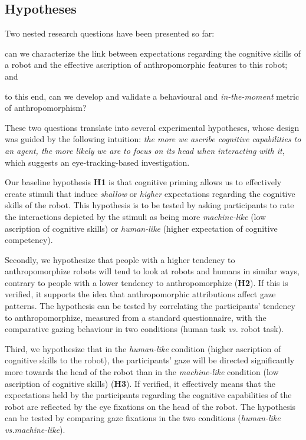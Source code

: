 \documentclass[lettersize, noapacite, twoside, HRI]{apa_HRI}
\newcommand{\vs}{\textit{vs.}\xspace}
\newcommand{\h}[1]{\textbf{H#1}\xspace}
\begin{document}
\subsection{Hypotheses}

\begin{inparaenum}
Two nested research questions have been presented so far: \item can we
characterize the link between expectations regarding the cognitive
skills of a robot and the effective ascription of anthropomorphic features to
this robot; and \item to this end, can we develop and validate a behavioural and
\emph{in-the-moment} metric of anthropomorphism?  \end{inparaenum}

These two questions translate into several experimental hypotheses, whose design
was guided by the following intuition: \emph{the more we ascribe cognitive
capabilities to an agent, the more likely we are to focus on its head when
interacting with it}, which suggests an eye-tracking-based investigation.



Our baseline hypothesis \h{1} is that cognitive priming allows us to effectively create
stimuli that induce \emph{shallow} or \emph{higher} expectations regarding the
cognitive skills of the robot. This hypothesis is to be tested by asking
participants to rate the interactions depicted by the stimuli as being more
\emph{machine-like} (low ascription of cognitive skills) or \emph{human-like}
(higher expectation of cognitive competency).

Secondly, we hypothesize that people with a higher tendency to anthropomorphize
robots will tend to look at robots and humans in similar ways, contrary to
people with a lower tendency to anthropomorphize (\h{2}). If this is verified,
it supports the idea that anthropomorphic attributions affect gaze patterns. The
hypothesis can be tested by correlating the participants' tendency to
anthropomorphize, measured from a standard questionnaire, with the comparative
gazing behaviour in two conditions (human task \vs robot task).

Third, we hypothesize that in the \emph{human-like} condition (higher ascription
of cognitive skills to the robot), the participants' gaze will be directed
significantly more towards the head of the robot than in the \emph{machine-like}
condition (low ascription of cognitive skills) (\h{3}). If verified, it
effectively means that the expectations held by the participants regarding the
cognitive capabilities of the robot are reflected by the eye fixations on the
head of the robot.  The hypothesis can be tested by comparing gaze fixations in
the two conditions (\emph{human-like} \vs \emph{machine-like}).
\end{document}
